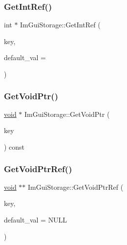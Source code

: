 \mbox{\label{structImGuiStorage_a28673fa7839263f3066ccb8e93e748a9}} 
\subsubsection{\texorpdfstring{Get\+Int\+Ref()}{GetIntRef()}}
{\footnotesize\ttfamily int $\ast$ Im\+Gui\+Storage\+::\+Get\+Int\+Ref (\begin{DoxyParamCaption}\item[{Im\+Gui\+ID}]{key,  }\item[{int}]{default\+\_\+val = {} }\end{DoxyParamCaption})}

\mbox{\label{structImGuiStorage_aaf87a98ede89da09113b0189f6d878ca}} 
\subsubsection{\texorpdfstring{Get\+Void\+Ptr()}{GetVoidPtr()}}
{\footnotesize\ttfamily \hyperlink{imgui__impl__opengl3__loader_8h_ac668e7cffd9e2e9cfee428b9b2f34fa7}{void} $\ast$ Im\+Gui\+Storage\+::\+Get\+Void\+Ptr (\begin{DoxyParamCaption}\item[{Im\+Gui\+ID}]{key }\end{DoxyParamCaption}) const}

\mbox{\label{structImGuiStorage_a2b203317f3f488818e9b9f416fe35332}} 
\subsubsection{\texorpdfstring{Get\+Void\+Ptr\+Ref()}{GetVoidPtrRef()}}
{\footnotesize\ttfamily \hyperlink{imgui__impl__opengl3__loader_8h_ac668e7cffd9e2e9cfee428b9b2f34fa7}{void} $\ast$$\ast$ Im\+Gui\+Storage\+::\+Get\+Void\+Ptr\+Ref (\begin{DoxyParamCaption}\item[{Im\+Gui\+ID}]{key,  }\item[{\hyperlink{imgui__impl__opengl3__loader_8h_ac668e7cffd9e2e9cfee428b9b2f34fa7}{void} $\ast$}]{default\+\_\+val = {\ttfamily NULL} }\end{DoxyParamCaption})}

